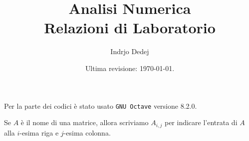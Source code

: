 


\title{Analisi Numerica \\ Relazioni di Laboratorio}
\author{Indrjo Dedej}
\date{Ultima revisione: \today{}.}



\maketitle

\tableofcontents

\begin{nota}
Per la parte dei codici è stato usato {\tt GNU Octave} versione 8.2.0.
\end{nota}

\begin{nota}
Se \(A\) è il nome di una matrice, allora scriviamo \(A_{i,j}\) per indicare l'entrata di \(A\) alla \(i\)-esima riga e \(j\)-esima colonna.
\end{nota}






